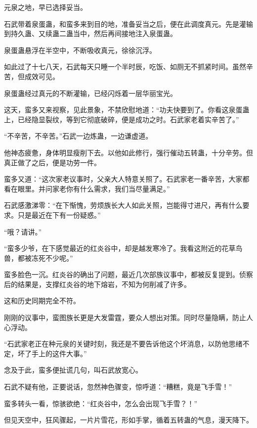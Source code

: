 
\begin{this_body}

元泉之地，早已选择妥当。

石武带着泉蛋蛊，和蛮多来到目的地，准备妥当之后，便在此调度真元。先是灌输到持久蛊、又续蛊二蛊当中，然后再间接地注入泉蛋蛊。

泉蛋蛊悬浮在半空中，不断吸收真元，徐徐沉浮。

如此过了十七八天，石武每天只睡一个半时辰，吃饭、如厕无不抓紧时间。虽然辛苦，但成效可见。

泉蛋蛊经过真元的不断灌输，已经闪烁着一层华丽宝光。

这天，蛮多又来视察，见此景象，不禁欣慰地道：“功夫快要到了。你看这泉蛋蛊上，已经隐显裂纹，等到它彻底破碎，便是成功之时。石武家老着实辛苦了。”

“不辛苦，不辛苦。”石武一边炼蛊，一边谦虚道。

他神态疲惫，身体明显瘦削下去。以他如此修行，强行催动五转蛊，十分辛劳。但真正做了之后，便是功劳一件。

蛮多又道：“这次家老议事时，父亲大人特意关照了。石武家老一番辛苦，大家都看在眼里。并问家老你有什么需求，我们当尽量满足。”

石武感激涕零：“在下惭愧，劳烦族长大人如此关照，岂能得寸进尺，再有什么要求。只是最近在下有一份疑惑。”

“哦？请讲。”

“蛮多少爷，在下感觉最近的红炎谷中，却是越发寒冷了。我看这附近的花草鸟兽，都被冻死不少呢。”

蛮多脸色一沉。红炎谷的确出了问题，最近几次部族议事中，都被反复提到。侦察后的结果是，支撑红炎谷的地下熔岩，不知为何削减了许多。

这和历史同期完全不符。

刚刚的议事中，蛮图族长更是大发雷霆，要众人想出对策。同时尽量隐瞒，防止人心浮动。

“石武家老正在种元泉的关键时刻，我还是不要告诉他这个坏消息，以防他思绪不定，坏了手上的这件大事。”

念及于此，蛮多便扯谎几句，叫石武放宽心。

石武不疑有他，正要说话，忽然神色骤变，惊呼道：“糟糕，竟是飞手雪！”

蛮多转头一看，惊骇欲绝：“红炎谷中，怎么会出现飞手雪？！”

但见天空中，狂风骤起，一片片雪花，形如手掌，循着五转蛊的气息，漫天降下。


\end{this_body}

